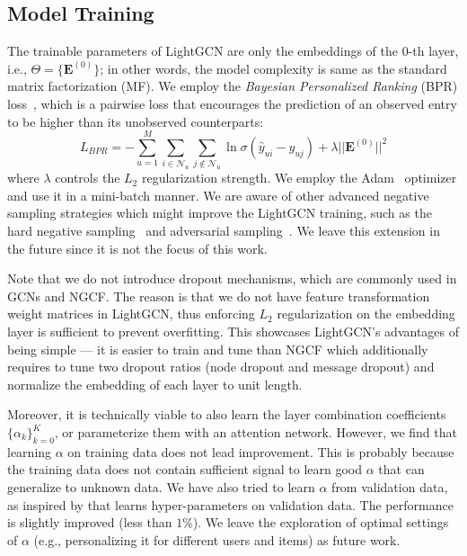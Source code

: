 \subsection{Model Training}
The trainable parameters of LightGCN are only the embeddings of the 0-th layer, i.e.,  $\Theta=\{\textbf{E}^{(0)}\}$; in other words, the model complexity is same as the standard matrix factorization (MF).
We employ the \textit{Bayesian Personalized Ranking} (BPR) loss~\cite{BPRMF}, which is a pairwise loss that encourages the prediction of an observed entry to be higher than its unobserved counterparts:
\begin{equation}
 L_{BPR} = - \sum_{u=1}^{M} \sum_{i \in \mathcal{N}_u} \sum_{j \notin \mathcal{N}_u} \ln \sigma (\hat{y}_{ui} - \hat{y}_{uj} ) + \lambda ||\textbf{E}^{(0)}||^2
\end{equation}
where $\lambda$ controls the $L_2$ regularization strength. We employ the Adam~\cite{Adam} optimizer and use it in a mini-batch manner.
We are aware of other advanced negative sampling strategies which might improve the LightGCN training, such as the hard negative sampling~\cite{rendle2014improving} and adversarial sampling~\cite{Ding2019IJCAI}. We leave this extension in the future since it is not the focus of this work. 

Note that we do not introduce dropout mechanisms, which are commonly used in GCNs and NGCF. The reason is that we do not have feature transformation weight matrices in LightGCN, thus enforcing $L_2$ regularization on the embedding layer is sufficient to prevent overfitting. 
This showcases LightGCN's advantages of being simple --- it is easier to train and tune than NGCF which additionally requires to tune two dropout ratios (node dropout and message dropout) and normalize the embedding of each layer to unit length. 

Moreover, it is technically viable to also learn the layer combination coefficients $\{\alpha_k\}_{k=0}^K$, or parameterize them with an attention network. However, we find that learning $\alpha$ on training data does not lead improvement. This is probably because the training data does not contain sufficient signal to learn good $\alpha$ that can generalize to unknown data. We have also tried to learn $\alpha$ from validation data, as inspired by \cite{lambdaOpt} that learns hyper-parameters on validation data. The performance is slightly improved (less than $1\%$). We leave the exploration of optimal settings of $\alpha$ (e.g., personalizing it for different users and items) as future work. 